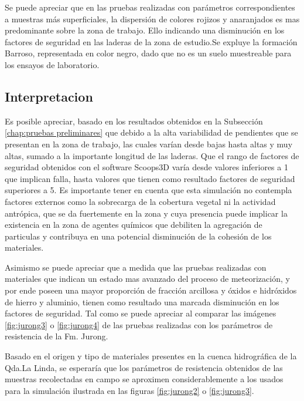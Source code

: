 Se puede apreciar que en las pruebas realizadas con par\'ametros correspondientes a muestras m\'as superficiales, la dispersi\'on de colores rojizos y anaranjados es mas predominante sobre la zona  de trabajo. Ello indicando una disminuci\'on en los factores de seguridad en las laderas de la zona de estudio.Se expluye la formaci\'on Barroso, representada en color negro, dado que no es un suelo muestreable para los ensayos de laboratorio.\par 

\subsection{Interpretacion}
Es posible  apreciar, basado en los resultados obtenidos en la Subsecci\'on \ref{chap:pruebas preliminares} que debido a la alta variabilidad de pendientes que se presentan en la zona de trabajo, las cuales var\'ian desde bajas hasta altas y muy altas, sumado a la importante longitud de las laderas. Que el rango de factores de seguridad obtenidos con el software Scoops3D var\'ia desde valores inferiores a 1 que implican falla, hasta valores que tienen como resultado factores de seguridad superiores a 5.
Es importante tener en cuenta que esta simulaci\'on no contempla factores externos como la sobrecarga de la cobertura vegetal ni la actividad antr\'opica, que se da fuertemente en la zona y cuya presencia puede implicar la existencia en la zona de agentes qu\'imicos que debiliten la agregaci\'on de particulas y contribuya en una potencial disminuci\'on de la cohesi\'on de los materiales.

Asimismo se puede apreciar que a medida que las pruebas realizadas con materiales que indican un estado mas avanzado del proceso de meteorizaci\'on, y por ende poseen una mayor proporci\'on de fracci\'on arcillosa y \'oxidos e hidr\'oxidos de hierro y aluminio, tienen como resultado una marcada disminuci\'on en los factores de seguridad. Tal como se puede apreciar al comparar las im\'agenes \ref{fig:jurong3} o \ref{fig:jurong4} de las pruebas realizadas con los par\'ametros de resistencia de la Fm. Jurong.

Basado en el origen y tipo de materiales presentes en la cuenca hidrogr\'afica de la Qda.La Linda, se esperar\'ia que los par\'ametros de resistencia obtenidos de las muestras recolectadas en campo se aproximen considerablemente a los usados para la simulaci\'on ilustrada en las figuras \ref{fig:jurong2} o \ref{fig:jurong3}.  


